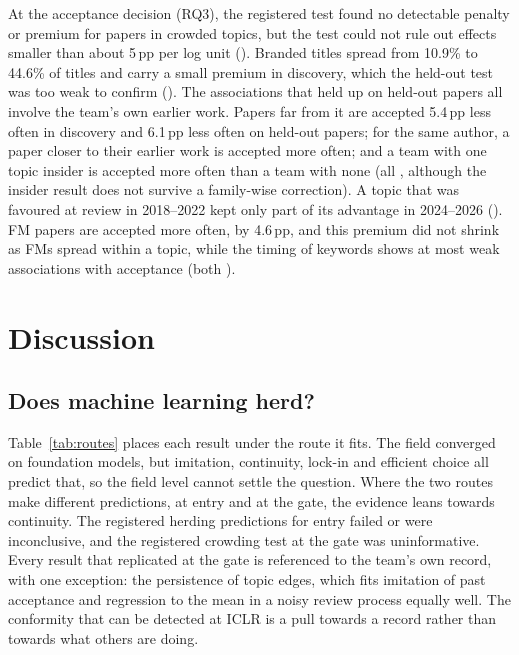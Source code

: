 At the acceptance decision (RQ3), the registered test found no detectable penalty or premium for papers in crowded
topics, but the test could not rule out effects smaller than about 5\,pp per log unit (). Branded
titles spread from 10.9\% to 44.6\% of titles and carry a small premium in discovery, which the held-out test was too
weak to confirm (). The associations that held up on held-out papers all involve the team's own
earlier work. Papers far from it are accepted 5.4\,pp less often in discovery and 6.1\,pp less often on held-out
papers; for the same author, a paper closer to their earlier work is accepted more often; and a team with one topic
insider is accepted more often than a team with none (all , although the insider result does
not survive a family-wise correction). A topic that was favoured at review in 2018--2022 kept only part of its
advantage in 2024--2026 (). FM papers are accepted more often, by 4.6\,pp, and this premium did
not shrink as FMs spread within a topic, while the timing of keywords shows at most weak associations with acceptance
(both ).

\section{Discussion}
\label{sec:discussion}

\subsection{Does machine learning herd?}

Table~\ref{tab:routes} places each result under the route it fits. The field converged on foundation models, but
imitation, continuity, lock-in and efficient choice all predict that, so the field level cannot settle the question.
Where the two routes make different predictions, at entry and at the gate, the evidence leans towards continuity. The
registered herding predictions for entry failed or were inconclusive, and the registered crowding test at the gate was
uninformative. Every result that replicated at the gate is referenced to the team's own record, with one exception:
the persistence of topic edges, which fits imitation of past acceptance and regression to the mean in a noisy review
process equally well. The conformity that can be detected at ICLR is a pull towards a record rather than towards what
others are doing.

